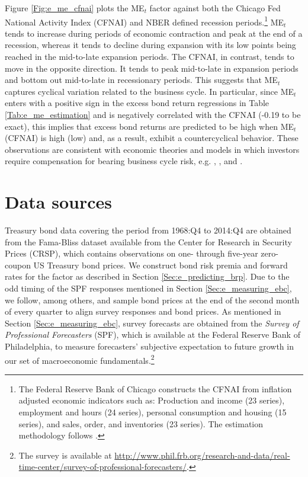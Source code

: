\documentclass[12pt,letterpaper,leqno,doublespacing]{article}
\begin{document}
Figure \ref{Fig:e_me_cfnai} plots the ME$_{t}$ factor against both the Chicago Fed National Activity Index (CFNAI) and NBER defined recession periods.\footnote{The Federal Reserve Bank of Chicago constructs the CFNAI from inflation adjusted economic indicators such as: Production and income (23 series), employment and hours (24 series), personal consumption and housing (15 series), and sales, order, and inventories (23 series). The estimation methodology follows \cite{StockWatson1999}.} ME$_{t}$ tends to increase during periods of economic contraction and peak at the end of a recession, whereas it tends to decline during expansion with its low points being reached in the mid-to-late expansion periods. The CFNAI, in contrast, tends to move in the opposite direction. It tends to peak mid-to-late in expansion periods and bottom out mid-to-late in recessionary periods. This suggests that ME$_{t}$ captures cyclical variation related to the business cycle. In particular, since ME$_{t}$ enters with a positive sign in the excess bond return regressions in Table \ref{Tab:e_me_estimation} and is negatively correlated with the CFNAI (-0.19 to be exact), this implies that excess bond returns are predicted to be high when ME$_{t}$ (CFNAI) is high (low) and, as a result, exhibit a countercyclical behavior. These observations are consistent with economic theories and models in which investors require compensation for bearing business cycle risk, e.g. \cite{CampbellCochrane1999}, \cite{Wachter2006}, and \cite{BuraschiHiltsov2007}.


\section{Data sources}\label{Sec:e_data}
Treasury bond data covering the period from 1968:Q4 to 2014:Q4 are obtained from the Fama-Bliss dataset available from the Center for Research in Security Prices (CRSP), which contains observations on one- through five-year zero-coupon US Treasury bond prices. We construct bond risk premia and forward rates for the \cite{CochranePiazzesi2005} factor as described in Section \ref{Sec:e_predicting_brp}. Due to the odd timing of the SPF responses mentioned in Section \ref{Sec:e_measuring_ebc}, we follow, among others, \cite{BansalShaliastovich2013} and sample bond prices at the end of the second month of every quarter to align survey responses and bond prices. As mentioned in Section \ref{Sec:e_measuring_ebc}, survey forecasts are obtained from the \textit{Survey of Professional Forecasters} (SPF), which is available at the Federal Reserve Bank of Philadelphia, to measure forecasters' subjective expectation to future growth in our set of macroeconomic fundamentals.\footnote{The survey is available at \url{http://www.phil.frb.org/research-and-data/real-time-center/survey-of-professional-forecasters/}.}
\end{document}
